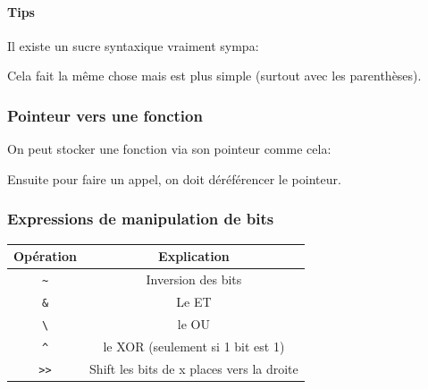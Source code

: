 \paragraph{Tips}\label{tips}

Il existe un sucre syntaxique vraiment sympa:

\begin{Shaded}
\begin{Highlighting}[]
\OperatorTok{(*}\OperatorTok{;}
\OperatorTok{{-}\textgreater{}}\OperatorTok{;}
\end{Highlighting}
\end{Shaded}

Cela fait la même chose mais est plus simple (surtout avec les
parenthèses).

\subsubsection{Pointeur vers une
fonction}\label{pointeur-vers-une-fonction}

On peut stocker une fonction via son pointeur comme cela:

\begin{Shaded}
\begin{Highlighting}[]
\OperatorTok{(*}\OperatorTok{)([}\OperatorTok{]+);}
 \OperatorTok{(*}\OperatorTok{)(}\OperatorTok{,} \OperatorTok{,} \OperatorTok{*);}
 \OperatorTok{(*}\OperatorTok{)(}\OperatorTok{);}
\OperatorTok{=} \OperatorTok{\&}\OperatorTok{;}
\end{Highlighting}
\end{Shaded}

Ensuite pour faire un appel, on doit déréférencer le pointeur.

\subsubsection{Expressions de manipulation de
bits}\label{expressions-de-manipulation-de-bits}

\begin{longtable}[]{@{}cc@{}}
\toprule\noalign{}
Opération & Explication \\
\midrule\noalign{}
\endhead
\bottomrule\noalign{}
\endlastfoot
\texttt{\textasciitilde{}} & Inversion des bits \\
\texttt{\&} & Le ET \\
\texttt{\textbackslash{}\textbar{}} & le OU \\
\texttt{\^{}} & le XOR (seulement si 1 bit est 1) \\
\texttt{\textgreater{}\textgreater{}} & Shift les bits de x places vers
la droite \\
\end{longtable}

